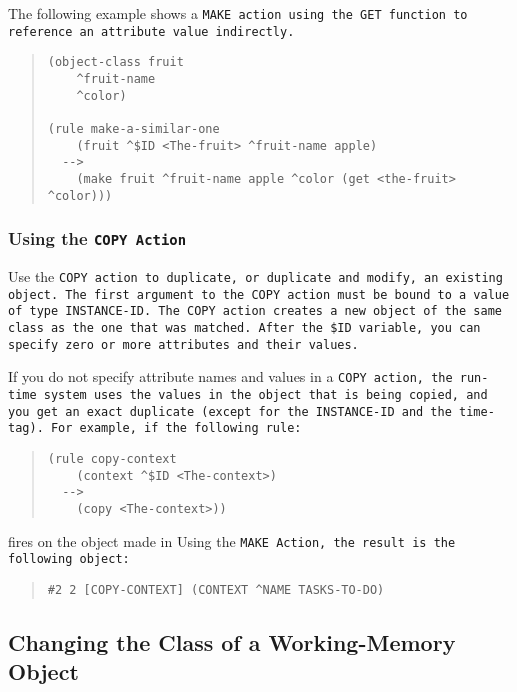 The following example shows a \tt{MAKE} action using the \tt{GET}
function to reference an attribute value indirectly.

\begin{quote}
\begin{verbatim}
(object-class fruit
    ^fruit-name
    ^color)

(rule make-a-similar-one
    (fruit ^$ID <The-fruit> ^fruit-name apple)
  -->
    (make fruit ^fruit-name apple ^color (get <the-fruit> ^color)))
\end{verbatim}
\end{quote}

\subsubsection*{Using the \tt{COPY} Action}

Use the \tt{COPY} action to duplicate, or duplicate and modify, an
existing object. The first argument to the \tt{COPY} action must be
bound to a value of type \tt{INSTANCE-ID}. The \tt{COPY} action
creates a new object of the same class as the one that was
matched. After the
\verb|$ID| variable, you can specify zero or more attributes and their
values.

If you do not specify attribute names and values in a \tt{COPY}
action, the run-time system uses the values in the object that is
being copied, and you get an exact duplicate (except for the
\tt{INSTANCE-ID} and the time-tag). For example, if the following
rule:

\begin{quote}
\begin{verbatim}
(rule copy-context
    (context ^$ID <The-context>)
  -->
    (copy <The-context>))
\end{verbatim}
\end{quote}

fires on the object made in Using the \tt{MAKE} Action, the result is
the following object:

\begin{quote}
\begin{verbatim}
#2 2 [COPY-CONTEXT] (CONTEXT ^NAME TASKS-TO-DO)
\end{verbatim}
\end{quote}

\subsection{Changing the Class of a Working-Memory Object}

